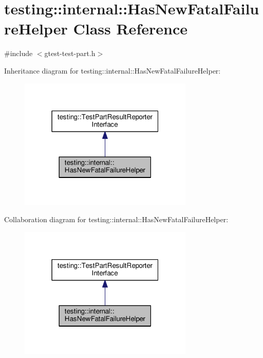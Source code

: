 \hypertarget{classtesting_1_1internal_1_1HasNewFatalFailureHelper}{}\section{testing\+:\+:internal\+:\+:Has\+New\+Fatal\+Failure\+Helper Class Reference}
\label{classtesting_1_1internal_1_1HasNewFatalFailureHelper}


{\ttfamily \#include $<$gtest-\/test-\/part.\+h$>$}



Inheritance diagram for testing\+:\+:internal\+:\+:Has\+New\+Fatal\+Failure\+Helper\+:\nopagebreak
\begin{figure}[H]
\begin{center}
\leavevmode
\includegraphics[width=235pt]{classtesting_1_1internal_1_1HasNewFatalFailureHelper__inherit__graph}
\end{center}
\end{figure}


Collaboration diagram for testing\+:\+:internal\+:\+:Has\+New\+Fatal\+Failure\+Helper\+:\nopagebreak
\begin{figure}[H]
\begin{center}
\leavevmode
\includegraphics[width=235pt]{classtesting_1_1internal_1_1HasNewFatalFailureHelper__coll__graph}
\end{center}
\end{figure}
